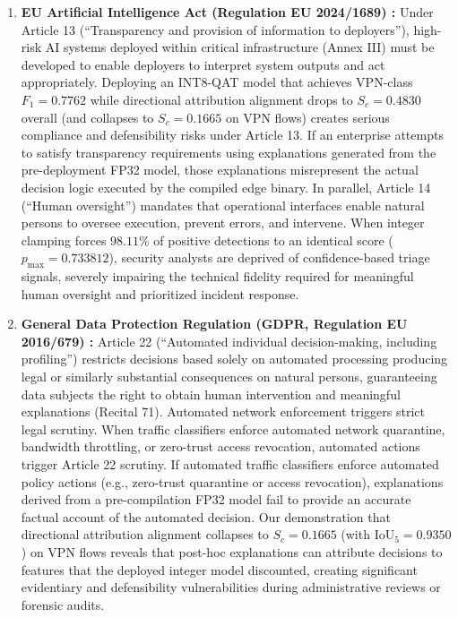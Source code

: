 \documentclass[conference]{IEEEtran}
\begin{document}
\begin{enumerate}
    \item \textbf{EU Artificial Intelligence Act (Regulation EU 2024/1689) \cite{b8}:} Under Article 13 (``Transparency and provision of information to deployers''), high-risk AI systems deployed within critical infrastructure (Annex III) must be developed to enable deployers to interpret system outputs and act appropriately. Deploying an INT8-QAT model that achieves VPN-class $F_1 = 0.7762$ while directional attribution alignment drops to $S_c = 0.4830$ overall (and collapses to $S_c = 0.1665$ on VPN flows) creates serious compliance and defensibility risks under Article 13. If an enterprise attempts to satisfy transparency requirements using explanations generated from the pre-deployment FP32 model, those explanations misrepresent the actual decision logic executed by the compiled edge binary. In parallel, Article 14 (``Human oversight'') mandates that operational interfaces enable natural persons to oversee execution, prevent errors, and intervene. When integer clamping forces $98.11\%$ of positive detections to an identical score ($p_{\max} = 0.733812$), security analysts are deprived of confidence-based triage signals, severely impairing the technical fidelity required for meaningful human oversight and prioritized incident response.
    \item \textbf{General Data Protection Regulation (GDPR, Regulation EU 2016/679) \cite{b7}:} Article 22 (``Automated individual decision-making, including profiling'') restricts decisions based solely on automated processing producing legal or similarly substantial consequences on natural persons, guaranteeing data subjects the right to obtain human intervention and meaningful explanations (Recital 71). Automated network enforcement triggers strict legal scrutiny. When traffic classifiers enforce automated network quarantine, bandwidth throttling, or zero-trust access revocation, automated actions trigger Article 22 scrutiny. If automated traffic classifiers enforce automated policy actions (e.g., zero-trust quarantine or access revocation), explanations derived from a pre-compilation FP32 model fail to provide an accurate factual account of the automated decision. Our demonstration that directional attribution alignment collapses to $S_c = 0.1665$ (with $\text{IoU}_5 = 0.9350$) on VPN flows reveals that post-hoc explanations can attribute decisions to features that the deployed integer model discounted, creating significant evidentiary and defensibility vulnerabilities during administrative reviews or forensic audits.

\end{enumerate}
\end{document}
